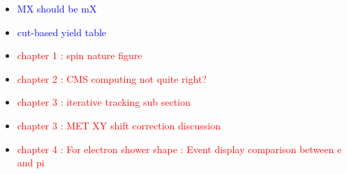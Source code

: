 \begin{itemize}
\item 
\textcolor{blue}{MX should be mX} 

\item
\textcolor{blue}{cut-based yield table} 

\item 
\textcolor{red}{chapter 1 : spin nature figure} 

\item 
\textcolor{red}{chapter 2 : CMS computing not quite right?} 

\item 
\textcolor{red}{chapter 3 : iterative tracking sub section} 

\item 
\textcolor{red}{chapter 3 : MET XY shift correction discussion} 

\item 
\textcolor{red}{chapter 4 : For electron shower shape : Event display comparison between e and pi} 

\end{itemize}
